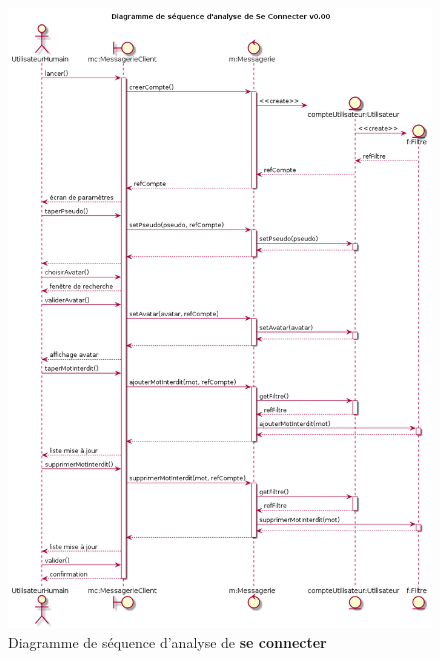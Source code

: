 \documentclass[11pt,dvipsnames,svgnames]{report}
\begin{document}
\begin{figure}[H]
\caption{Diagramme de séquence d'analyse de \textbf{se connecter}}
\centerline{\includegraphics[width=\textwidth]{diagrammes/dsa-connexion.png}}
\end{figure}
\end{document}
